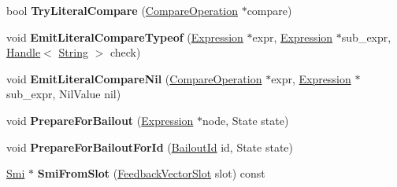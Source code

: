 \begin{DoxyCompactItemize}
\item 
bool {\bfseries Try\+Literal\+Compare} (\hyperlink{classv8_1_1internal_1_1_compare_operation}{Compare\+Operation} $\ast$compare)\hypertarget{classv8_1_1internal_1_1_full_code_generator_a654122d821922f14f47366a1fad8c452}{}\label{classv8_1_1internal_1_1_full_code_generator_a654122d821922f14f47366a1fad8c452}

\item 
void {\bfseries Emit\+Literal\+Compare\+Typeof} (\hyperlink{classv8_1_1internal_1_1_expression}{Expression} $\ast$expr, \hyperlink{classv8_1_1internal_1_1_expression}{Expression} $\ast$sub\+\_\+expr, \hyperlink{classv8_1_1internal_1_1_handle}{Handle}$<$ \hyperlink{classv8_1_1internal_1_1_string}{String} $>$ check)\hypertarget{classv8_1_1internal_1_1_full_code_generator_a182a31bda77bf57502a443089319f42e}{}\label{classv8_1_1internal_1_1_full_code_generator_a182a31bda77bf57502a443089319f42e}

\item 
void {\bfseries Emit\+Literal\+Compare\+Nil} (\hyperlink{classv8_1_1internal_1_1_compare_operation}{Compare\+Operation} $\ast$expr, \hyperlink{classv8_1_1internal_1_1_expression}{Expression} $\ast$sub\+\_\+expr, Nil\+Value nil)\hypertarget{classv8_1_1internal_1_1_full_code_generator_aa97275ac35a1232c38fb1360c339c101}{}\label{classv8_1_1internal_1_1_full_code_generator_aa97275ac35a1232c38fb1360c339c101}

\item 
void {\bfseries Prepare\+For\+Bailout} (\hyperlink{classv8_1_1internal_1_1_expression}{Expression} $\ast$node, State state)\hypertarget{classv8_1_1internal_1_1_full_code_generator_a871640a5e12f4e74144d9124d8a707f4}{}\label{classv8_1_1internal_1_1_full_code_generator_a871640a5e12f4e74144d9124d8a707f4}

\item 
void {\bfseries Prepare\+For\+Bailout\+For\+Id} (\hyperlink{classv8_1_1internal_1_1_bailout_id}{Bailout\+Id} id, State state)\hypertarget{classv8_1_1internal_1_1_full_code_generator_a1a70de6555f611eba428fe0673f504ca}{}\label{classv8_1_1internal_1_1_full_code_generator_a1a70de6555f611eba428fe0673f504ca}

\item 
\hyperlink{classv8_1_1internal_1_1_smi}{Smi} $\ast$ {\bfseries Smi\+From\+Slot} (\hyperlink{classv8_1_1internal_1_1_feedback_vector_slot}{Feedback\+Vector\+Slot} slot) const \hypertarget{classv8_1_1internal_1_1_full_code_generator_a71d101322d3ee461030e15e4e70d3581}{}\label{classv8_1_1internal_1_1_full_code_generator_a71d101322d3ee461030e15e4e70d3581}


\end{DoxyCompactItemize}
